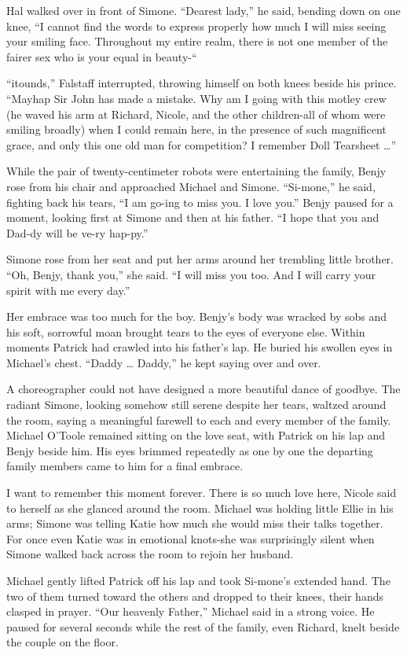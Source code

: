 \documentclass[]{article}
\begin{document}
{Hal walked over in front of Simone. “Dearest lady,” he said, bending down on one knee, “I cannot find the words to express properly how much I will miss seeing your smiling face. Throughout my entire realm, there is not one member of the fairer sex who is your equal in beauty-“

“itounds,” Falstaff interrupted, throwing himself on both knees beside his prince. “Mayhap Sir John has made a mistake. Why am I going with this motley crew (he waved his arm at Richard, Nicole, and the other children-all of whom were smiling broadly) when I could remain here, in the presence of such magnificent grace, and only this one old man for competition? I remember Doll Tearsheet …”

While the pair of twenty-centimeter robots were entertaining the family, Benjy rose from his chair and approached Michael and Simone. “Si-mone,” he said, fighting back his tears, “I am go-ing to miss you. I love you.” Benjy paused for a moment, looking first at Simone and then at his father. “I hope that you and Dad-dy will be ve-ry hap-py.”

Simone rose from her seat and put her arms around her trembling little brother. “Oh, Benjy, thank you,” she said. “I will miss you too. And I will carry your spirit with me every day.”

Her embrace was too much for the boy. Benjy’s body was wracked by sobs and his soft, sorrowful moan brought tears to the eyes of everyone else. Within moments Patrick had crawled into his father’s lap. He buried his swollen eyes in Michael’s chest. “Daddy … Daddy,” he kept saying over and over.

A choreographer could not have designed a more beautiful dance of goodbye. The radiant Simone, looking somehow still serene despite her tears, waltzed around the room, saying a meaningful farewell to each and every member of the family. Michael O’Toole remained sitting on the love seat, with Patrick on his lap and Benjy beside him. His eyes brimmed repeatedly as one by one the departing family members came to him for a final embrace.

I want to remember this moment forever. There is so much love here, Nicole said to herself as she glanced around the room. Michael was holding little Ellie in his arms; Simone was telling Katie how much she would miss their talks together. For once even Katie was in emotional knots-she was surprisingly silent when Simone walked back across the room to rejoin her husband.

Michael gently lifted Patrick off his lap and took Si-mone’s extended hand. The two of them turned toward the others and dropped to their knees, their hands clasped in prayer. “Our heavenly Father,” Michael said in a strong voice. He paused for several seconds while the rest of the family, even Richard, knelt beside the couple on the floor.

}
\end{document}
